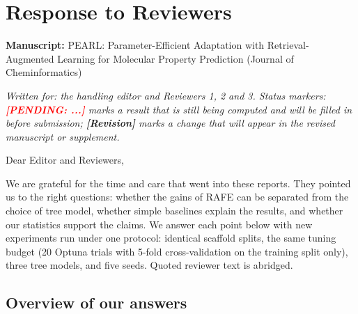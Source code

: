 \documentclass[
  10pt,
]{article}
\author{}
\date{}
\newcommand{\placeholder}[1]{\textcolor{red}{\textbf{[PENDING#1]}}}
\begin{document}
\hypertarget{response-to-reviewers}{%
\section{Response to Reviewers}\label{response-to-reviewers}}

\textbf{Manuscript:} PEARL: Parameter-Efficient Adaptation with
Retrieval-Augmented Learning for Molecular Property Prediction (Journal
of Cheminformatics)

\emph{Written for: the handling editor and Reviewers 1, 2 and 3. Status
markers: \placeholder{: ...} marks a result that is still being
computed and will be filled in before submission;
\textbf{{[}Revision{]}} marks a change that will appear in the revised
manuscript or supplement.}

Dear Editor and Reviewers,

We are grateful for the time and care that went into these reports. They
pointed us to the right questions: whether the gains of RAFE can be
separated from the choice of tree model, whether simple baselines
explain the results, and whether our statistics support the claims. We
answer each point below with new experiments run under one protocol:
identical scaffold splits, the same tuning budget (20 Optuna trials with
5-fold cross-validation on the training split only), three tree models,
and five seeds. Quoted reviewer text is abridged.

\hypertarget{overview-of-our-answers}{%
\subsection{Overview of our answers}\label{overview-of-our-answers}}
\end{document}
